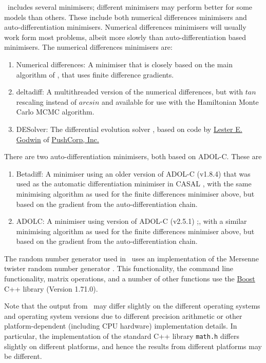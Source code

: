 \CNAME\ includes several minimisers; different minimisers may perform better for some models than others. These include both numerical differences minimisers and auto-differentiation minimisers. Numerical differences minimisers will usually work form most problems, albeit more slowly than auto-differentiation based minimisers. The numerical differences minimisers are:

\begin{enumerate}
\item Numerical differences: A minimiser that is closely based on the main algorithm of \cite{779}, that uses finite difference gradients.
\item deltadiff: A multithreaded version of the numerical differences, but with $tan$ rescaling instead of $arcsin$ and available for use with the Hamiltonian Monte Carlo MCMC algorithm.
\item DESolver: The differential evolution solver \citep{1442}, based on code by \href{mailto:<godwin@pushcorp.com>}{Lester E. Godwin} of \href{http://www.pushcorp.com}{PushCorp, Inc.}
\end{enumerate}

There are two auto-differentiation minimisers, both based on ADOL-C. These are
\begin{enumerate}
\item Betadiff: A minimiser using an older version of ADOL-C (v1.8.4) that was used as the automatic differentiation minimiser in CASAL \citep{1388}, with the same minimising algorithm as used for the finite differences minimiser above, but based on the gradient from the auto-differentiation chain.
\item ADOLC: A minimiser using version of ADOL-C (v2.5.1) \citep{walther1996adolc};, with a similar minimising algorithm as used for the finite differences minimiser above, but based on the gradient from the auto-differentiation chain.
\end{enumerate}

The random number generator used in \CNAME\ uses an implementation of the Mersenne twister random number generator \citep{796}. This functionality, the command line functionality, matrix operations, and a number of other functions use the \href{http://www.boost.org/}{Boost} C++ library (Version 1.71.0).

Note that the output from \CNAME\ may differ slightly on the different operating systems and operating system versions due to different precision arithmetic or other platform-dependent (including CPU hardware) implementation details. In particular, the implementation of the standard C++ library \texttt{math.h} differs slightly on different platforms, and hence the results from different platforms may be different.

